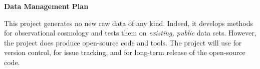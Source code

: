 \documentclass[12pt]{article}
\begin{document}
\sloppy\sloppypar\thispagestyle{empty}

\noindent
\textsf{\textbf{Data Management Plan}}
\smallskip

This project generates no new raw data of any kind.
Indeed, it develops methods for observational cosmology and tests them
on \emph{existing, public} data sets.
However, the project does produce open-source code and tools.
The project will use  for version control,
 for issue tracking, and  for
long-term release of the open-source code.
\end{document}
